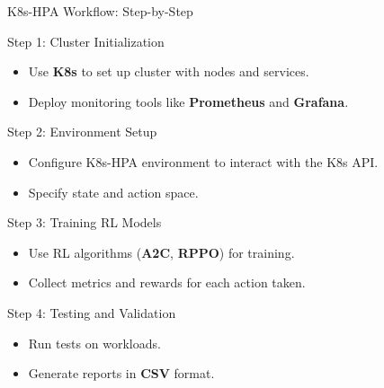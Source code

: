 \documentclass{beamer}
\begin{document}
\begin{frame}{K8s-HPA Workflow: Step-by-Step}
    \begin{block}{Step 1: Cluster Initialization}
        \begin{itemize}
            \item Use \textbf{K8s} to set up cluster with nodes and services.
            \item Deploy monitoring tools like \textbf{Prometheus} and \textbf{Grafana}.
        \end{itemize}
    \end{block}
    
    \begin{block}{Step 2: Environment Setup}
        \begin{itemize}
            \item Configure K8s-HPA environment to interact with the K8s API.
            \item Specify state and action space.
        \end{itemize}
    \end{block}

    \begin{block}{Step 3: Training RL Models}
        \begin{itemize}
            \item Use RL algorithms (\textbf{A2C}, \textbf{RPPO}) for training.
            \item Collect metrics and rewards for each action taken.
        \end{itemize}
    \end{block}

    \begin{block}{Step 4: Testing and Validation}
        \begin{itemize}
            \item Run tests on workloads.
            \item Generate reports in \textbf{CSV} format.
        \end{itemize}
    \end{block}
\end{frame}
\end{document}
